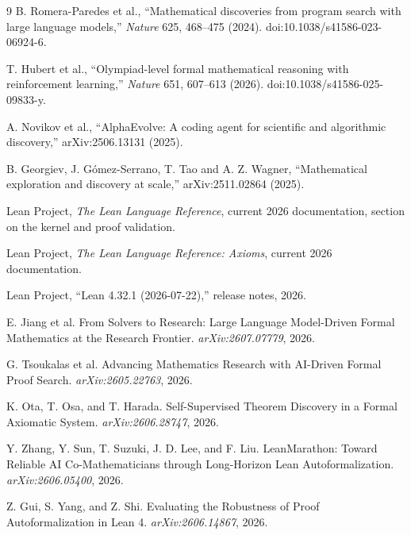\begin{thebibliography}{9}
B. Romera-Paredes et al., ``Mathematical discoveries from program search with large language models,'' \emph{Nature} 625, 468--475 (2024). doi:10.1038/s41586-023-06924-6.

T. Hubert et al., ``Olympiad-level formal mathematical reasoning with reinforcement learning,'' \emph{Nature} 651, 607--613 (2026). doi:10.1038/s41586-025-09833-y.

A. Novikov et al., ``AlphaEvolve: A coding agent for scientific and algorithmic discovery,'' arXiv:2506.13131 (2025).

B. Georgiev, J. G\'omez-Serrano, T. Tao and A. Z. Wagner, ``Mathematical exploration and discovery at scale,'' arXiv:2511.02864 (2025).

Lean Project, \emph{The Lean Language Reference}, current 2026 documentation, section on the kernel and proof validation.

Lean Project, \emph{The Lean Language Reference: Axioms}, current 2026 documentation.

Lean Project, ``Lean 4.32.1 (2026-07-22),'' release notes, 2026.


E. Jiang et al. From Solvers to Research: Large Language Model-Driven Formal Mathematics at the Research Frontier. \emph{arXiv:2607.07779}, 2026.

G. Tsoukalas et al. Advancing Mathematics Research with AI-Driven Formal Proof Search. \emph{arXiv:2605.22763}, 2026.

K. Ota, T. Osa, and T. Harada. Self-Supervised Theorem Discovery in a Formal Axiomatic System. \emph{arXiv:2606.28747}, 2026.

Y. Zhang, Y. Sun, T. Suzuki, J. D. Lee, and F. Liu. LeanMarathon: Toward Reliable AI Co-Mathematicians through Long-Horizon Lean Autoformalization. \emph{arXiv:2606.05400}, 2026.

Z. Gui, S. Yang, and Z. Shi. Evaluating the Robustness of Proof Autoformalization in Lean 4. \emph{arXiv:2606.14867}, 2026.

\end{thebibliography}
